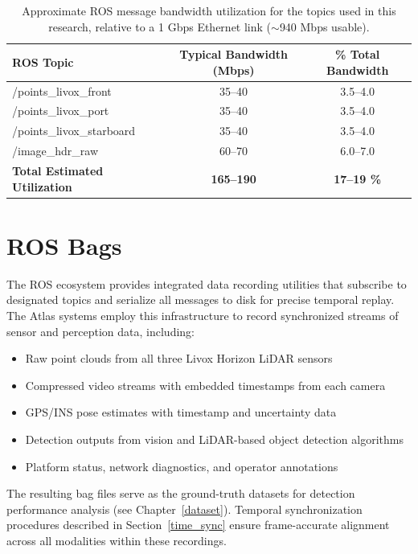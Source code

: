 \documentclass{erauthesis}
\begin{document}
\begin{table}[htbp]
\centering
\begin{tabular}{lcc}
\hline
ROS Topic & Typical Bandwidth (Mbps) & \% Total Bandwidth \\
\hline
/points\_livox\_front & 35--40 & 3.5--4.0 \\
/points\_livox\_port  & 35--40 & 3.5--4.0 \\
/points\_livox\_starboard & 35--40 & 3.5--4.0 \\
/image\_hdr\_raw  & 60--70 & 6.0--7.0 \\
\hline
\textbf{Total Estimated Utilization} & \textbf{165--190} & \textbf{17--19 \%} \\
\hline
\end{tabular}
\label{table:ROS_bandwidth}
\caption{Approximate \ac{ROS} message bandwidth utilization for the topics used in this research, relative to a 1 Gbps Ethernet link ($\sim$940 Mbps usable).}
\end{table}

\section{ROS Bags} \label{ROS_bags}

The \ac{ROS} ecosystem provides integrated data recording utilities that subscribe to designated topics and serialize all messages to disk for precise temporal replay.
The Atlas systems employ this infrastructure to record synchronized streams of sensor and perception data, including:

\begin{itemize}
\item Raw point clouds from all three Livox Horizon \ac{LiDAR} sensors
\item Compressed video streams with embedded timestamps from each camera
\item GPS/INS pose estimates with timestamp and uncertainty data
\item Detection outputs from vision and \ac{LiDAR}-based object detection algorithms
\item Platform status, network diagnostics, and operator annotations
\end{itemize}

The resulting bag files serve as the ground-truth datasets for detection performance analysis (see Chapter~\ref{dataset}).
Temporal synchronization procedures described in Section~\ref{time_sync} ensure frame-accurate alignment across all modalities within these recordings.
\end{document}
